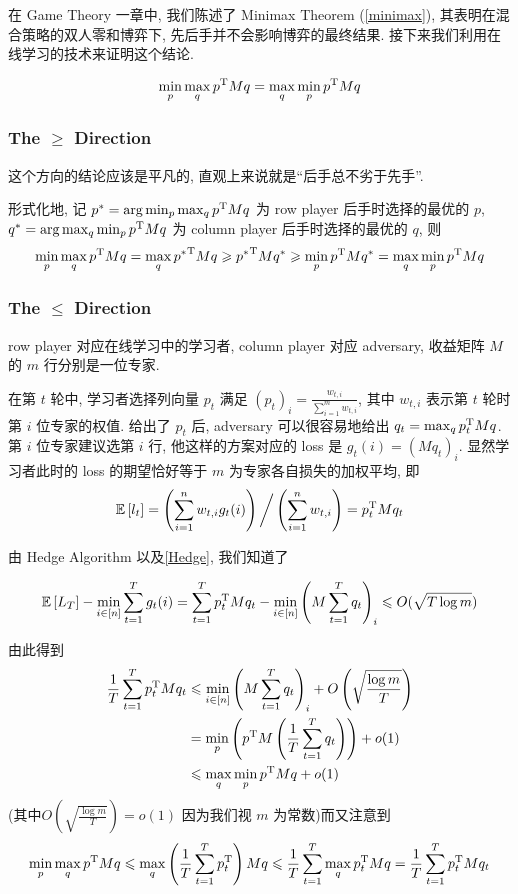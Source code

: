\documentclass[8pt]{article}
\theoremstyle{compact}
\def\le{\leqslant}
\def\ge{\geqslant}
\def\E#1{\mathbb{E}\left[{#1}\right]}
\begin{document}
在 Game Theory 一章中, 我们陈述了 Minimax Theorem (\cref{minimax}), 其表明在混合策略的双人零和博弈下, 先后手并不会影响博弈的最终结果. 接下来我们利用在线学习的技术来证明这个结论.

$$\min_p\max_q p^{\text T}Mq = \max_q\min_p p^{\text T}Mq$$

\subsubsection{The $\ge$ Direction}

这个方向的结论应该是平凡的, 直观上来说就是“后手总不劣于先手”. 

形式化地, 记 $p^* = \arg\min_p\max_qp^{\text T}Mq$ 为 row player 后手时选择的最优的 $p$, $q^* = \arg\max_q\min_pp^{\text T}Mq$ 为 column player 后手时选择的最优的 $q$, 则 $$\min_p\max_q p^{\text T}Mq = \max_q {p^*}^{\text T}Mq \ge {p^*}^{\text T}Mq^* \ge \min_p p^{\text T}Mq^* = \max_q\min_p p^{\text T}Mq$$

\subsubsection{The $\le$ Direction}

row player 对应在线学习中的学习者, column player 对应 adversary, 收益矩阵 $M$ 的 $m$ 行分别是一位专家.

在第 $t$ 轮中, 学习者选择列向量 $p_t$ 满足 $(p_t)_i = \frac{w_{t, i}}{\sum_{i=1}^{m}w_{t, i}}$, 其中 $w_{t, i}$ 表示第 $t$ 轮时第 $i$ 位专家的权值. 给出了 $p_t$ 后, adversary 可以很容易地给出 $q_t = \max_{q}p_t^{\text T}Mq$. 第 $i$ 位专家建议选第 $i$ 行, 他这样的方案对应的 loss 是 $g_t(i) = (Mq_t)_i$. 显然学习者此时的 loss 的期望恰好等于 $m$ 为专家各自损失的加权平均, 即 $$\E{l_t} = \left(\sum\limits_{i=1}^{n}w_{t, i}g_t(i)\right) \bigg/ \left(\sum\limits_{i=1}^{n}w_{t, i}\right) = p_t^{\text T}Mq_t$$

由 Hedge Algorithm 以及\cref{Hedge}, 我们知道了

$$\E{L_T} - \min_{i \in [n]}\sum_{t=1}^{T}g_t(i) = \sum_{t=1}^{T}p_t^{\text T}Mq_t - \min_{i \in [n]}\left(M\sum_{t=1}^{T}q_t\right)_i \le O(\sqrt{T\log m})$$

由此得到
\begin{equation*}
	\begin{split}
		\frac1T\sum_{t=1}^{T}p_t^{\text T}Mq_t &\le \min_{i \in [n]}\left(M\sum_{t=1}^{T}q_t\right)_i + O\left(\sqrt{\frac{\log m}{T}}\right)\\
		&= \min_p\left(p^{\text T}M\left(\frac1T\sum_{t=1}^Tq_t\right)\right) + o(1)\\
		&\le \max_q\min_p p^{\text T}Mq + o(1)
	\end{split}
\end{equation*}
(其中$O\left(\sqrt{\frac{\log m}{T}}\right) = o(1)$ 因为我们视 $m$ 为常数)而又注意到 $$\min_p\max_q p^{\text T}Mq \le \max_q \left(\frac1T\sum_{t=1}^{T}p_t^{\text T}\right)Mq \le \frac1T\sum_{t=1}^T\max_qp_t^{\text T}Mq = \frac1T\sum_{t=1}^{T}p_t^{\text T}Mq_t$$
\end{document}
